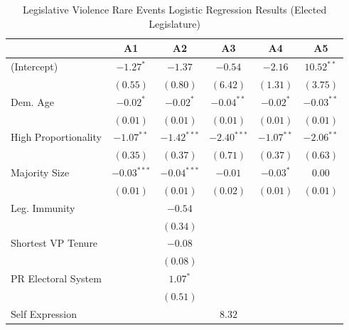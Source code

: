 \documentclass[a4paper]{article}\usepackage{graphicx, color}
\begin{document}
\begin{table}
\caption{Legislative Violence Rare Events Logistic Regression Results (Elected Legislature)}
\label{outputTable.dem}
\begin{center}

\begin{tabular}{l c c c c c }
\hline
                     & A1 & A2 & A3 & A4 & A5 \\
\hline
(Intercept)          & $-1.27^{*}$   & $-1.37$       & $-0.54$       & $-2.16$      & $10.52^{**}$  \\
                     & $(0.55)$      & $(0.80)$      & $(6.42)$      & $(1.31)$     & $(3.75)$      \\
Dem. Age             & $-0.02^{*}$   & $-0.02^{*}$   & $-0.04^{**}$  & $-0.02^{*}$  & $-0.03^{**}$  \\
                     & $(0.01)$      & $(0.01)$      & $(0.01)$      & $(0.01)$     & $(0.01)$      \\
High Proportionality & $-1.07^{**}$  & $-1.42^{***}$ & $-2.40^{***}$ & $-1.07^{**}$ & $-2.06^{**}$  \\
                     & $(0.35)$      & $(0.37)$      & $(0.71)$      & $(0.37)$     & $(0.63)$      \\
Majority Size        & $-0.03^{***}$ & $-0.04^{***}$ & $-0.01$       & $-0.03^{*}$  & $0.00$        \\
                     & $(0.01)$      & $(0.01)$      & $(0.02)$      & $(0.01)$     & $(0.01)$      \\
Leg. Immunity        &               & $-0.54$       &               &              &               \\
                     &               & $(0.34)$      &               &              &               \\
Shortest VP Tenure   &               & $-0.08$       &               &              &               \\
                     &               & $(0.08)$      &               &              &               \\
PR Electoral System  &               & $1.07^{*}$    &               &              &               \\
                     &               & $(0.51)$      &               &              &               \\
Self Expression      &               &               & $8.32$        &              &               \\

\end{tabular}
\end{center}
\end{table}
\end{document}
